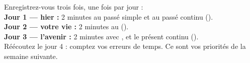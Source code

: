 \begin{mission}
Enregistrez-vous trois fois, une fois par jour :\\
\textbf{Jour 1 --- hier :} 2 minutes au passé simple et au passé continu
().\\
\textbf{Jour 2 --- votre vie :} 2 minutes au 
().\\
\textbf{Jour 3 --- l'avenir :} 2 minutes avec ,  et le présent continu
().\\
Réécoutez le jour 4 : comptez vos erreurs de temps. Ce sont vos priorités de la semaine
suivante.
\end{mission}
